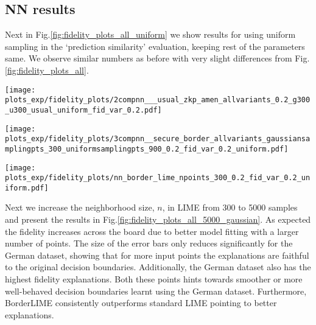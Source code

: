 \subsection{NN results}

Next in Fig.\ref{fig:fidelity_plots_all_uniform} we show results for using uniform sampling in the `prediction similarity' evaluation, keeping rest of the parameters same. We observe similar numbers as before with very slight differences from Fig.\ref{fig:fidelity_plots_all}.

\begin{figure*}[hbt!]
    \centering
    \begin{minipage}{0.35\linewidth}
        \centering
        \texttt{[image: plots\_exp/fidelity\_plots/2compnn\_\_\_usual\_zkp\_amen\_allvariants\_0.2\_g300\_u300\_usual\_uniform\_fid\_var\_0.2.pdf]}
        \label{fig:simpvsorig_nn_uniform}
    \end{minipage}\hfill
    \begin{minipage}{0.35\linewidth}
        \centering
        \texttt{[image: plots\_exp/fidelity\_plots/3compnn\_\_secure\_border\_allvariants\_gaussiansamplingpts\_300\_uniformsamplingpts\_900\_0.2\_fid\_var\_0.2\_uniform.pdf]}
        \label{fig:border_3comp_all_nn_uniform}
    \end{minipage}\hfill
    \begin{minipage}{0.29\linewidth}
        \centering
        \texttt{[image: plots\_exp/fidelity\_plots/nn\_border\_lime\_npoints\_300\_0.2\_fid\_var\_0.2\_uniform.pdf]}
        \label{fig:borderlimevsnormal_nn_300_uniform}
    \end{minipage}\hfill
    \caption{Results for NNs for $n=300$ neighboring points and uniform sampling in the evaluation. Left: Fidelity of different variants of Standard LIME, Mid: Fidelity of different variants of BorderLIME, Right: Fidelity of Standard vs. BorderLIME.}
    \label{fig:fidelity_plots_all_uniform}
\end{figure*}

Next we increase the neighborhood size, $n$, in LIME from 300 to 5000 samples and present the results in Fig.\ref{fig:fidelity_plots_all_5000_gaussian}. As expected the fidelity increases across the board due to better model fitting with a larger number of points. The size of the error bars only reduces significantly for the German dataset, showing that for more input points the explanations are faithful to the original decision boundaries. Additionally, the German dataset also has the highest fidelity explanations. Both these points hints towards smoother or more well-behaved decision boundaries learnt using the German dataset. Furthermore, BorderLIME consistently outperforms standard LIME pointing to better explanations.



